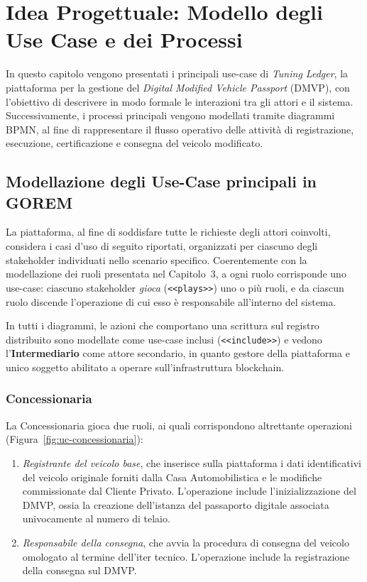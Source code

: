 \chapter{Idea Progettuale: Modello degli Use Case e dei Processi}

In questo capitolo vengono presentati i principali use-case di \textit{Tuning Ledger}, la piattaforma per la gestione del \textit{Digital Modified Vehicle Passport} (DMVP), con l'obiettivo di descrivere in modo formale le interazioni tra gli attori e il sistema. Successivamente, i processi principali vengono modellati tramite diagrammi BPMN, al fine di rappresentare il flusso operativo delle attività di registrazione, esecuzione, certificazione e consegna del veicolo modificato.

\section{Modellazione degli Use-Case principali in GOREM}

La piattaforma, al fine di soddisfare tutte le richieste degli attori coinvolti, considera i casi d'uso di seguito riportati, organizzati per ciascuno degli stakeholder individuati nello scenario specifico. Coerentemente con la modellazione dei ruoli presentata nel Capitolo~3, a ogni ruolo corrisponde uno use-case: ciascuno stakeholder \textit{gioca} (\texttt{<<plays>>}) uno o più ruoli, e da ciascun ruolo discende l'operazione di cui esso è responsabile all'interno del sistema.

In tutti i diagrammi, le azioni che comportano una scrittura sul registro distribuito sono modellate come use-case inclusi (\texttt{<<include>>}) e vedono l'\textbf{Intermediario} come attore secondario, in quanto gestore della piattaforma e unico soggetto abilitato a operare sull'infrastruttura blockchain.

\subsection*{Concessionaria}

La Concessionaria gioca due ruoli, ai quali corrispondono altrettante operazioni (Figura~\ref{fig:uc-concessionaria}):

\begin{enumerate}
    \item \textit{Registrante del veicolo base}, che inserisce sulla piattaforma i dati identificativi del veicolo originale forniti dalla Casa Automobilistica e le modifiche commissionate dal Cliente Privato. L'operazione include l'inizializzazione del DMVP, ossia la creazione dell'istanza del passaporto digitale associata univocamente al numero di telaio.
    \item \textit{Responsabile della consegna}, che avvia la procedura di consegna del veicolo omologato al termine dell'iter tecnico. L'operazione include la registrazione della consegna sul DMVP.
\end{enumerate}

